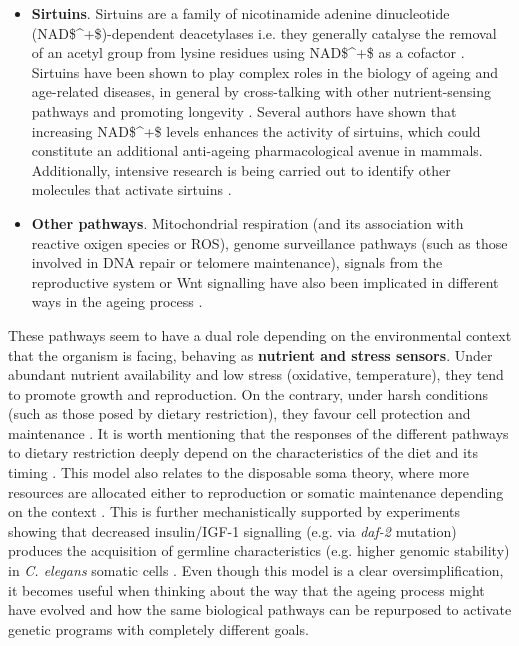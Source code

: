 \begin{itemize}
	\item \textbf{Sirtuins}. Sirtuins are a family of nicotinamide adenine dinucleotide (\acrshort{NAD$^+$})-dependent deacetylases i.e. they generally catalyse the removal of an acetyl group from lysine residues using \acrshort{NAD$^+$} as a cofactor \cite{Bonkowski2016}. Sirtuins have been shown to play complex roles in the biology of ageing and age-related diseases, in general by cross-talking with other nutrient-sensing pathways and promoting longevity \cite{Kenyon2010,Bonkowski2016}. Several authors have shown that increasing \acrshort{NAD$^+$} levels enhances the activity of sirtuins, which could constitute an additional anti-ageing pharmacological avenue in mammals. Additionally, intensive research is being carried out to identify other molecules that activate sirtuins \cite{Bonkowski2016}.
	
	\item \textbf{Other pathways}. Mitochondrial respiration (and its association with reactive oxigen species or \acrshort{ROS}), genome surveillance pathways (such as those involved in DNA repair or telomere maintenance), signals from the reproductive system or Wnt signalling have also been implicated in different ways in the ageing process \cite{Kenyon2010,Greer2008, Lezzerini2014}.
	
\end{itemize}


These pathways seem to have a dual role depending on the environmental context that the organism is facing, behaving as \textbf{nutrient and stress sensors}. Under abundant nutrient availability and low stress (oxidative, temperature), they tend to promote growth and reproduction. On the contrary, under harsh conditions (such as those posed by dietary restriction), they favour cell protection and maintenance \cite{Kenyon2005,Kenyon2010}. It is worth mentioning that the responses of the different pathways to dietary restriction deeply depend on the characteristics of the diet and its timing \cite{Kenyon2010}. This model also relates to the disposable soma theory, where more resources are allocated either to reproduction or somatic maintenance depending on the context \cite{Kirkwood1977,Kirkwood1991}. This is further mechanistically supported by experiments showing that decreased insulin/IGF-1 signalling (e.g. via \textit{daf-2} mutation) produces the acquisition of germline characteristics (e.g. higher genomic stability) in \textit{C. elegans} somatic cells \cite{Curran2009}. Even though this model is a clear oversimplification, it becomes useful when thinking about the way that the ageing process might have evolved and how the same biological pathways can be repurposed to activate genetic programs with completely different goals.

